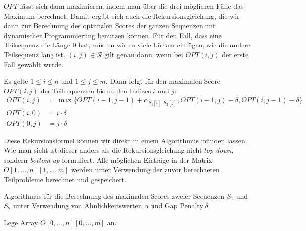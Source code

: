$OPT$ lässt sich dann maximieren, indem man über die drei möglichen Fälle das Maximum berechnet. Damit ergibt sich auch die Rekursionsgleichung, die wir dann zur Berechnung des optimalen Scores der ganzen Sequenzen mit dynamischer Programmierung benutzen können. Für den Fall, dass eine Teilsequenz die Länge 0 hat, müssen wir so viele Lücken einfügen, wie die andere Teilsequenz lang ist. $(i,j) \in \mathcal{R}$ gilt genau dann, wenn bei $OPT(i,j)$ der erste Fall gewählt wurde.

\begin{korollar}
	Es gelte $1 \leq i \leq n$ und $1 \leq j \leq m$. Dann folgt für den maximalen Score $OPT(i,j)$ der Teilsequenzen bis zu den Indizes $i$ und $j$:
	\begin{equation}
	\begin{split}
	OPT(i,j) & = \max\{OPT(i-1,j-1) + \alpha_{S_1[i],S_2[j]}, OPT(i-1,j) - \delta, OPT(i,j-1) - \delta\} \\
	OPT(i,0) & = i\cdot \delta \\
	OPT(0,j) & = j\cdot \delta 
	\end{split}
	\end{equation}
\end{korollar}

Diese Rekursionsformel können wir direkt in einem Algorithmus münden lassen. Wie man sieht ist dieser anders als die Rekursionsgleichung nicht \emph{top-down}, sondern \emph{bottom-up} formuliert. Alle möglichen Einträge in der Matrix $O[1,\dots,n][1,\dots,m]$ werden unter Verwendung der zuvor berechneten Teilprobleme berechnet und gespeichert. 

\begin{algorithm}
	\caption{Algorithmus für die Berechnung des maximalen Scores zweier Sequenzen $S_1$ und $S_2$ unter Verwendung von Ähnlichkeitswerten $\alpha$ und Gap Penalty $\delta$}
	\label{alg:opt_nw}
	\begin{algorithmic}[1]
		\State Lege Array $O[0,\dots,n][0,\dots,m]$ an.
		 
		\EndFor
		 
		\EndFor
		\EndFor
		\EndFor
		\EndProcedure
	\end{algorithmic}
\end{algorithm}

